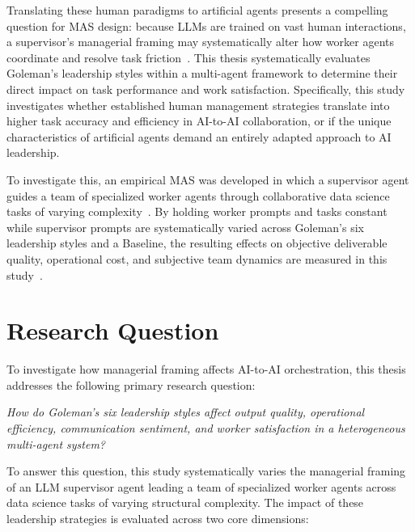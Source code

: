 Translating these human paradigms to artificial agents presents a compelling question for \ac{MAS} design: 
because \acp{LLM} are trained on vast human interactions, a supervisor's managerial framing may systematically alter how worker agents coordinate and resolve task friction~\cite{park2023generativeagentsinteractivesimulacra, salewski2023incontextimpersonationrevealslarge, shanahan2023roleplaylargelanguagemodels, serapiogarcia2025personalitytraitslargelanguage}. 
This thesis systematically evaluates Goleman's leadership styles within a multi-agent framework to determine their direct impact on task performance and work satisfaction. 
Specifically, this study investigates whether established human management strategies translate into higher task accuracy and efficiency in AI-to-AI collaboration, or if the unique characteristics of artificial agents demand an entirely adapted approach to AI leadership.

To investigate this, an empirical \ac{MAS} was developed in which a supervisor agent guides a team of specialized worker agents through collaborative data science tasks of varying complexity~\cite{dang2025multiagentcollaborationevolvingorchestration, muralidharan2025lessonshumanteamsapplied, wang2025talkstructurallyacthierarchically}.
By holding worker prompts and tasks constant while supervisor prompts are systematically varied across Goleman's six leadership styles and a Baseline, the resulting effects on objective deliverable quality, operational cost, and subjective team dynamics are measured in this study~\cite{goleman2000leadership, kwak2026leadershipcoordinationcontrolbehavioral, muralidharan2025lessonshumanteamsapplied}.

\section{Research Question}
\label{sec:research-question}

To investigate how managerial framing affects AI-to-AI orchestration, this thesis addresses the following primary research question:

\textit{How do Goleman's six leadership styles affect output quality, operational efficiency, communication sentiment, and worker satisfaction in a heterogeneous multi-agent system?}

To answer this question, this study systematically varies the managerial framing of an \ac{LLM} supervisor agent leading a team of specialized worker agents across data science tasks of varying structural complexity. 
The impact of these leadership strategies is evaluated across two core dimensions:

